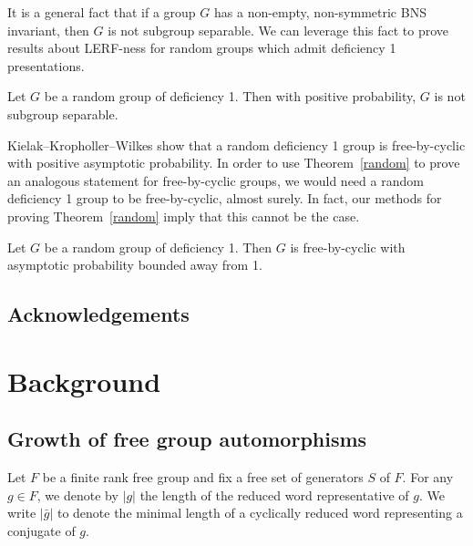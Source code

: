 It is a general fact that if a group $G$ has a non-empty, non-symmetric BNS invariant, then $G$ is not subgroup separable. We can leverage this fact to prove results about LERF-ness for random groups which admit deficiency 1 presentations. 
\begin{thmx}\label{random}
Let $G$ be a random group of deficiency 1. Then with positive probability, $G$ is not subgroup separable.
\end{thmx}
Kielak--Kropholler--Wilkes \cite{KKW} show that a random deficiency 1 group is free-by-cyclic with positive asymptotic probability. In order to use Theorem~\ref{random} to prove an analogous statement for free-by-cyclic groups, we would need a random deficiency 1 group to be free-by-cyclic, almost surely. In fact, our methods for proving Theorem~\ref{random} imply that this cannot be the case. 
\begin{corx}
Let $G$ be a random group of deficiency 1. Then $G$ is free-by-cyclic with asymptotic probability bounded away from 1.
\end{corx}

\subsection*{Acknowledgements}



\section{Background}

\subsection{Growth of free group automorphisms}

Let $F$ be a finite rank free group and fix a free set of generators $S$ of $F$. For any $g\in F$, we denote by $|g|$ the length of the reduced word representative of $g$. We write $|\bar{g}|$ to denote the minimal length of a cyclically reduced word representing a conjugate of $g$. %

